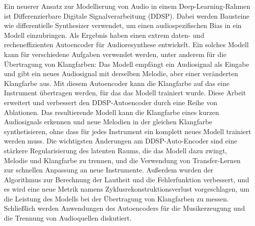 \begin{zusammenfassung}
    Ein neuerer Ansatz zur Modellierung von Audio in einem Deep-Learning-Rahmen ist Differenzierbare Digitale Signalverarbeitung (DDSP).
    Dabei werden Bausteine wie differentielle Synthesizer verwendet, um einen audiospezifischen Bias in ein Modell einzubringen.
    Als Ergebnis haben \citet{ddsp} einen extrem daten- und recheneffizienten Autoencoder für Audioresynthese entwickelt.
    Ein solches Modell kann für verschiedene Aufgaben verwendet werden, unter anderem für die Übertragung von Klangfarben: Das Modell empfängt ein Audiosignal als Eingabe und gibt ein neues Audiosignal mit derselben Melodie, aber einer veränderten Klangfarbe aus. Mit diesem Autoencoder kann die Klangfarbe auf das eine Instrument übertragen werden, für das das Modell trainiert wurde. \newline
    Diese Arbeit erweitert und verbessert den DDSP-Autoencoder durch eine Reihe von Ablationen.
    Das resultierende Modell kann die Klangfarbe eines kurzen Audiosignals erkennen und neue Melodien in der gleichen Klangfarbe synthetisieren, ohne dass für jedes Instrument ein komplett neues Modell trainiert werden muss. \newline
    Die wichtigsten Änderungen am DDSP-Auto-Encoder sind eine stärkere Regularisierung des latenten Raums, die das Modell dazu zwingt, Melodie und Klangfarbe zu trennen, und die Verwendung von Transfer-Lernen zur schnellen Anpassung an neue Instrumente.
    Außerdem wurden der Algorithmus zur Berechnung der Lautheit und die Fehlerfunktion  verbessert, und es wird eine neue Metrik namens Zyklusrekonstruktionsverlust vorgeschlagen, um die Leistung des Modells bei der Übertragung von Klangfarben zu messen. \newline
    Schließlich werden Anwendungen des Autoencoders für die Musikerzeugung und die Trennung von Audioquellen diskutiert.
\end{zusammenfassung}